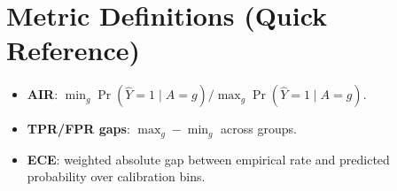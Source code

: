 
\section{Metric Definitions (Quick Reference)}
\begin{itemize}[leftmargin=*]
\item \textbf{AIR}: $\min_g \Pr(\hat{Y}=1\mid A=g) / \max_g \Pr(\hat{Y}=1\mid A=g)$.
\item \textbf{TPR/FPR gaps}: $\max_g - \min_g$ across groups.
\item \textbf{ECE}: weighted absolute gap between empirical rate and predicted probability over calibration bins.
\end{itemize}

